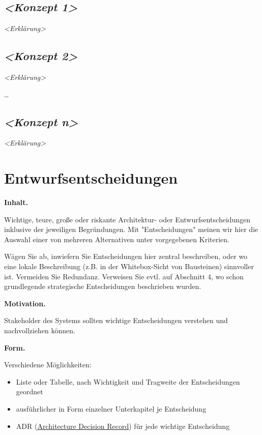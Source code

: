 \documentclass[]{article}
\begin{document}
\subsection{\texorpdfstring{\emph{\textless{}Konzept
1\textgreater{}}}{\textless{}Konzept 1\textgreater{}}}\label{__emphasis_konzept_1_emphasis}

\emph{\textless{}Erklärung\textgreater{}}

\subsection{\texorpdfstring{\emph{\textless{}Konzept
2\textgreater{}}}{\textless{}Konzept 2\textgreater{}}}\label{__emphasis_konzept_2_emphasis}

\emph{\textless{}Erklärung\textgreater{}}

\ldots{}

\subsection{\texorpdfstring{\emph{\textless{}Konzept
n\textgreater{}}}{\textless{}Konzept n\textgreater{}}}\label{__emphasis_konzept_n_emphasis}

\emph{\textless{}Erklärung\textgreater{}}

\section{Entwurfsentscheidungen}\label{section-design-decisions}

\textbf{Inhalt.}

Wichtige, teure, große oder riskante Architektur- oder
Entwurfsentscheidungen inklusive der jeweiligen Begründungen. Mit
"Entscheidungen" meinen wir hier die Auswahl einer von mehreren
Alternativen unter vorgegebenen Kriterien.

Wägen Sie ab, inwiefern Sie Entscheidungen hier zentral beschreiben,
oder wo eine lokale Beschreibung (z.B. in der Whitebox-Sicht von
Bausteinen) sinnvoller ist. Vermeiden Sie Redundanz. Verweisen Sie evtl.
auf Abschnitt 4, wo schon grundlegende strategische Entscheidungen
beschrieben wurden.

\textbf{Motivation.}

Stakeholder des Systems sollten wichtige Entscheidungen verstehen und
nachvollziehen können.

\textbf{Form.}

Verschiedene Möglichkeiten:

\begin{itemize}
\item
  Liste oder Tabelle, nach Wichtigkeit und Tragweite der Entscheidungen
  geordnet
\item
  ausführlicher in Form einzelner Unterkapitel je Entscheidung
\item
  ADR
  (\href{http://thinkrelevance.com/blog/2011/11/15/documenting-architecture-decisions}{Architecture
  Decision Record}) für jede wichtige Entscheidung
\end{itemize}
\end{document}

